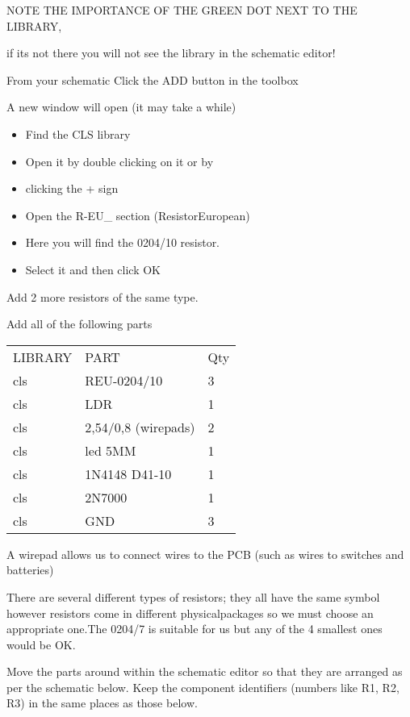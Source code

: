 NOTE THE IMPORTANCE OF THE GREEN DOT NEXT TO THE LIBRARY,

if its not there you will not see the library in the schematic editor!


From your schematic Click the ADD button in the toolbox

A new window will open (it may take a while)

\begin{itemize}
\item Find the CLS library
\item Open it by double clicking on it or by
\item clicking the + sign
\item Open the R-EU\_ section (ResistorEuropean)
\item Here you will find the 0204/10 resistor.
\item Select it and then click OK
\end{itemize}

Add 2 more resistors of the same type.

Add all of the following parts

\begin{tabular}{l l l}

 LIBRARY
& PART
& Qty
\\
cls
&REU-0204/10
&3
\\
cls
&LDR
&1
\\
cls
&2,54/0,8 (wirepads)
&2
\\
cls
&led 5MM
&1
\\
cls
&1N4148 D41-10
&1
\\
cls
&2N7000
&1
\\
cls
&GND
&3
\end{tabular}

A wirepad allows us to connect wires to the PCB (such as wires to switches and
batteries)


There are several different types of resistors; they all have the same symbol
however resistors come in different physicalpackages so we must choose an
appropriate one.The 0204/7 is suitable for us but any of the 4 smallest ones
would be OK.


Move the parts around within the schematic editor so that they are arranged as
per the schematic below. Keep the component identifiers (numbers like R1, R2,
R3) in the same places as those below.

